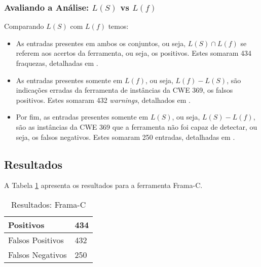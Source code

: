   \subsubsection{Avaliando a Análise: $L(S)$ vs $L(f)$}

  Comparando $L(S)$ com $L(f)$ temos:

\begin{itemize}
  \item As entradas presentes em ambos os conjuntos, ou seja, $L(S) \cap L(f)$ se referem aos acertos da ferramenta, ou seja, os positivos. Estes somaram 434 fraquezas, detalhadas em .

  \item As entradas presentes somente em $L(f)$, ou seja, $L(f) - L(S)$, são indicações erradas da ferramenta de instâncias da CWE 369, os falsos positivos. Estes somaram 432 \textit{warnings}, detalhados em .

  \item Por fim, as entradas presentes somente em $L(S)$, ou seja, $L(S) - L(f)$, são as instâncias da CWE 369 que a ferramenta não foi capaz de detectar, ou seja, os falsos negativos. Estes somaram 250 entradas, detalhadas em .
\end{itemize}

  \subsection{Resultados}

A Tabela \ref{tabela_framac1} apresenta os resultados para a ferramenta Frama-C.
\begin{table}[h]
\caption{Resultados: Frama-C}
  \centering
\begin{tabular}{l | l}
  \hline
  Positivos\index{positivo} & 434 \\ \hline
  Falsos Positivos\index{falso positivo} & 432 \\ \hline
  Falsos Negativos\index{falso negativo} & 250 \\
  \hline
\end{tabular}
\label{tabela_framac1}
\end{table}

